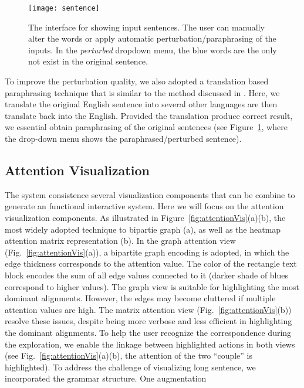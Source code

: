 \begin{figure}[htbp]
\centering
\vspace{-2mm}
 \texttt{[image: sentence]}
 \caption{
The interface for showing input sentences. The user can manually alter the words or apply automatic perturbation/paraphrasing of the inputs. In the \emph{perturbed} dropdown menu, the blue words are the only not exist in the original sentence.
 }
\label{fig:sentence}
\end{figure}

To improve the perturbation quality, we also adopted a translation based paraphrasing technique that is similar to the method discussed in \cite{mallinson2017paraphrasing}. Here, we translate the original English sentence into several other languages are then translate back into the English. Provided the translation produce correct result, we essential obtain paraphrasing of the original sentences (see Figure~\ref{fig:sentence}, where the drop-down menu shows the paraphrased/perturbed sentence).

\subsection{Attention Visualization}
The system consistence several visualization components that can be combine to generate an functional interactive system. Here we will focus on the attention visualization components. 
As illustrated in Figure~\ref{fig:attentionVis}(a)(b), the most widely adopted technique to bipartie graph (a), as well as the heatmap attention matrix representation (b). 
%
In the graph attention view (Fig.~\ref{fig:attentionVis}(a)), a bipartite graph encoding is adopted, in which the edge thickness corresponds to the attention value. The color of the rectangle text block encodes the sum of all edge values connected to it (darker shade of blues correspond to higher values).
The graph view is suitable for highlighting the most dominant alignments. However, the edges may become cluttered if multiple attention values are high. The matrix attention view (Fig.~\ref{fig:attentionVis}(b)) resolve these issues, despite being more verbose and less efficient in highlighting the dominant alignments. 
To help the user recognize the correspondence during the exploration, we enable the linkage between highlighted actions in both views (see Fig.~\ref{fig:attentionVis}(a)(b), the attention of the two ``couple'' is highlighted).
%
To address the challenge of visualizing long sentence, we incorporated the grammar structure.
One augmentation 

